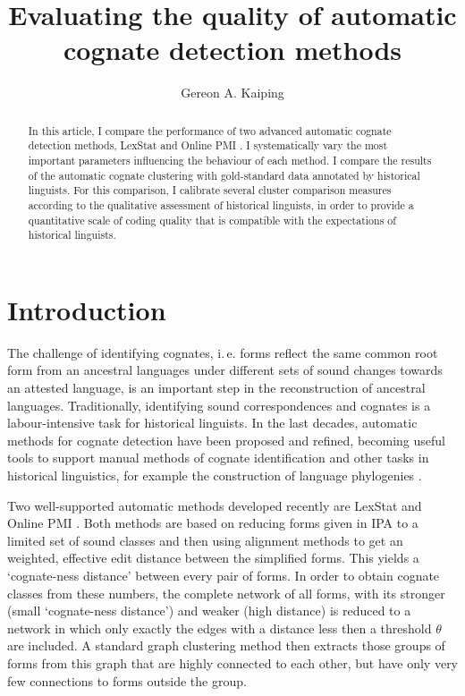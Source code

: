 \documentclass[a4paper,11pt,twocolumn]{scrartcl}
\begin{document}
\title{Evaluating the quality of automatic cognate detection methods}
\author[1]{Gereon A. Kaiping}

\maketitle
\begin{abstract}
In this article, I compare the performance of two advanced automatic cognate detection methods, LexStat \parencite{list2012lexstat} and Online PMI \parencite{rama2017fast}. I systematically vary the most important parameters influencing the behaviour of each method. I compare the results of the automatic cognate clustering with gold-standard data annotated by historical linguists. For this comparison, I calibrate several cluster comparison measures according to the qualitative assessment of historical linguists, in order to provide a quantitative scale of coding quality that is compatible with the expectations of historical linguists.
\end{abstract}
\section{Introduction}
The challenge of identifying cognates, i.\,e. forms reflect the same common root form from an ancestral languages under different sets of sound changes towards an attested language, is an important step in the reconstruction of ancestral languages. Traditionally, identifying sound correspondences and cognates is a labour-intensive task for historical linguists.
In the last decades, automatic methods for cognate detection have been proposed and refined, becoming useful tools to support manual methods of cognate identification and other tasks in historical linguistics, for example the construction of language phylogenies \parencite{rama2018are}.

Two well-supported automatic methods developed recently are LexStat \parencite{list2012lexstat} and Online PMI \parencite{rama2017fast}. Both methods are based on reducing forms given in IPA to a limited set of sound classes and then using alignment methods to get an weighted, effective edit distance between the simplified forms. This yields a ‘cognate-ness distance’ between every pair of forms. In order to obtain cognate classes from these numbers, the complete network of all forms, with its stronger (small ‘cognate-ness distance’) and weaker (high distance) is reduced to a network in which only exactly the edges with a distance less then a threshold $θ$ are included. A standard graph clustering method then extracts those groups of forms from this graph that are highly connected to each other, but have only very few connections to forms outside the group.
\end{document}
